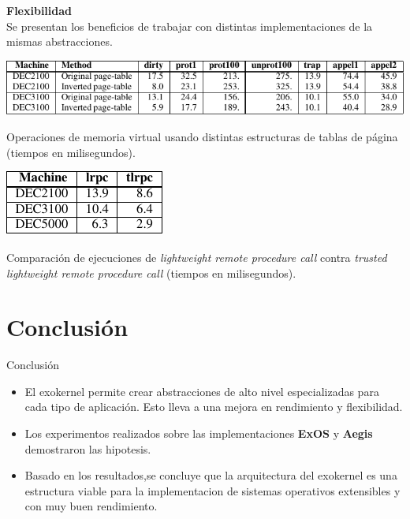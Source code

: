 \documentclass[10pt]{beamer}
\begin{document}
\begin{frame}
\textbf{Flexibilidad} \\[2em]
Se presentan los beneficios de trabajar con distintas implementaciones de la mismas abstracciones. 
\begin{table}
 \includegraphics[scale=0.8]{grafico-pages.pdf}
\caption{Operaciones de memoria virtual usando distintas estructuras de tablas de página (tiempos en milisegundos).}
\end{table}

\begin{table}
\includegraphics[scale=0.8]{grafico-tlrpc.pdf}
\caption{Comparación de ejecuciones de \emph{lightweight remote procedure call} contra \emph{trusted lightweight remote procedure call} (tiempos en milisegundos).}
\end{table}
\end{frame}

\section{Conclusión}

\begin{frame}{Conclusión}
 \begin{itemize}
  \item El exokernel permite crear abstracciones de alto nivel especializadas para cada tipo de aplicación. Esto lleva a una mejora en rendimiento y 			  flexibilidad.
  \item Los experimentos realizados sobre las implementaciones \textbf{ExOS} y \textbf{Aegis} demostraron las hipotesis.
  \item Basado en los resultados,se concluye que la arquitectura del exokernel es una estructura viable para la implementacion de sistemas operativos extensibles y con muy buen rendimiento.
\end{itemize}
\end{frame}



\end{document}
